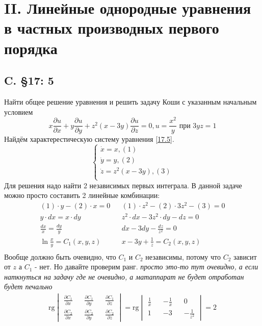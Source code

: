 \documentclass{article}
\newcommand{\rg}{\text{rg}}
\begin{document}
\section{II. Линейные однородные уравнения в частных производных первого порядка}
\subsection{C. \S17: 5}
Найти общее решение уравнения и решить задачу Коши с указанным
начальным условием
\begin{equation}\label{17.5}
x \frac{\partial u}{\partial x}+y \frac{\partial u}{\partial y}+z^{2}(x-3 y) \frac{\partial u}{\partial z}=0, u=\frac{x^{2}}{y} \text { при } 3 y z=1
\end{equation}
Найдём характерестическую систему уравнения \ref{17.5}.
\begin{equation*}
    \begin{cases}
        \dot x=x, (1)\\
        \dot y = y, (2)\\
        \dot z = z^2(x-3y),(3)\\
    \end{cases}
\end{equation*}
Для решения надо найти 2 независимых первых интеграла. В данной задаче можно просто составить 2 линейные комбинации: 
\begin{align*}
    (1) \cdot y-(2) \cdot x=0 && (1)\cdot z^2-(2)\cdot 3z^2 -(3)=0\\
    y \cdot dx  = x \cdot dy &&   z^2 \cdot dx - 3z^2 \cdot dy -dz=0\\
    \frac{dx}{x}=\frac{dy}{y} && dx - 3dy - \frac{dz}{z^2}=0\\
    \ln{\frac{x}{y}}=C_1(x,y,z) && x-3y+\frac{1}{z}=C_2(x,y,z)\\
\end{align*}
Вообще должно быть очевидно, что $C_1$ и $C_2$ независимы, потому что $C_2$ зависит от $z$ а $C_1$ - нет. Но давайте проверим ранг.  \textcolor[rgb]{0.480469,0.566406,0.480469}{\textit{просто это-то тут очевидно, а если наткнуться на задачу где не очевидно, а матаппарат не будет отработан будет печально}}\\
\begin{gather*}
\rg \begin{vmatrix}
        \frac{\partial C_1}{\partial x} && \frac{\partial C_1}{\partial y} && \frac{\partial C_1}{\partial z}\\
        \frac{\partial C_2}{\partial x} && \frac{\partial C_2}{\partial y} && \frac{\partial C_2}{\partial z}
    \end{vmatrix} = 
     \rg \begin{vmatrix}
        \frac{1}{x}&& -\frac{1}{x } && 0\\
        1 &&-3 && -\frac{1}{z^2}
    \end{vmatrix} = 2                                                   
\end{gather*}                                               
\end{document}
